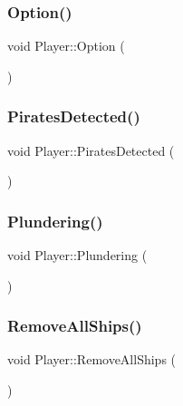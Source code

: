 \mbox{\label{class_player_aa1687475b3c27bd0bb904fe5033ea176}} 
\subsubsection{\texorpdfstring{Option()}{Option()}}
{\footnotesize\ttfamily void Player\+::\+Option (\begin{DoxyParamCaption}{ }\end{DoxyParamCaption})}

\mbox{\label{class_player_a305da8fa45422dcd8fe3d5f92e4c6c7f}} 
\subsubsection{\texorpdfstring{Pirates\+Detected()}{PiratesDetected()}}
{\footnotesize\ttfamily void Player\+::\+Pirates\+Detected (\begin{DoxyParamCaption}{ }\end{DoxyParamCaption})}

\mbox{\label{class_player_ac2310aba7bab5049f6ff4c7b3392566e}} 
\subsubsection{\texorpdfstring{Plundering()}{Plundering()}}
{\footnotesize\ttfamily void Player\+::\+Plundering (\begin{DoxyParamCaption}{ }\end{DoxyParamCaption})}

\mbox{\label{class_player_ae10e677107b02aba1e5e3626d3138abf}} 
\subsubsection{\texorpdfstring{Remove\+All\+Ships()}{RemoveAllShips()}}
{\footnotesize\ttfamily void Player\+::\+Remove\+All\+Ships (\begin{DoxyParamCaption}{ }\end{DoxyParamCaption})}

